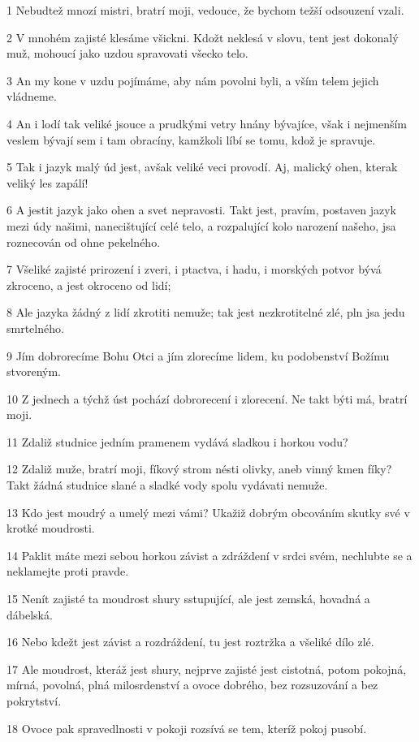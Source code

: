 \par 1 Nebudtež mnozí mistri, bratrí moji, vedouce, že bychom težší odsouzení vzali.
\par 2 V mnohém zajisté klesáme všickni. Kdožt neklesá v slovu, tent jest dokonalý muž, mohoucí jako uzdou spravovati všecko telo.
\par 3 An my kone v uzdu pojímáme, aby nám povolni byli, a vším telem jejich vládneme.
\par 4 An i lodí tak veliké jsouce a prudkými vetry hnány bývajíce, však i nejmenším veslem bývají sem i tam obracíny, kamžkoli líbí se tomu, kdož je spravuje.
\par 5 Tak i jazyk malý úd jest, avšak veliké veci provodí. Aj, malický ohen, kterak veliký les zapálí!
\par 6 A jestit jazyk jako ohen a svet nepravosti. Takt jest, pravím, postaven jazyk mezi údy našimi, nanecištující celé telo, a rozpalující kolo narození našeho, jsa roznecován od ohne pekelného.
\par 7 Všeliké zajisté prirození i zveri, i ptactva, i hadu, i morských potvor bývá zkroceno, a jest okroceno od lidí;
\par 8 Ale jazyka žádný z lidí zkrotiti nemuže; tak jest nezkrotitelné zlé, pln jsa jedu smrtelného.
\par 9 Jím dobrorecíme Bohu Otci a jím zlorecíme lidem, ku podobenství Božímu stvoreným.
\par 10 Z jednech a týchž úst pochází dobrorecení i zlorecení. Ne takt býti má, bratrí moji.
\par 11 Zdaliž studnice jedním pramenem vydává sladkou i horkou vodu?
\par 12 Zdaliž muže, bratrí moji, fíkový strom nésti olivky, aneb vinný kmen fíky? Takt žádná studnice slané a sladké vody spolu vydávati nemuže.
\par 13 Kdo jest moudrý a umelý mezi vámi? Ukažiž dobrým obcováním skutky své v krotké moudrosti.
\par 14 Paklit máte mezi sebou horkou závist a zdráždení v srdci svém, nechlubte se a neklamejte proti pravde.
\par 15 Nenít zajisté ta moudrost shury sstupující, ale jest zemská, hovadná a dábelská.
\par 16 Nebo kdežt jest závist a rozdráždení, tu jest roztržka a všeliké dílo zlé.
\par 17 Ale moudrost, kteráž jest shury, nejprve zajisté jest cistotná, potom pokojná, mírná, povolná, plná milosrdenství a ovoce dobrého, bez rozsuzování a bez pokrytství.
\par 18 Ovoce pak spravedlnosti v pokoji rozsívá se tem, kteríž pokoj pusobí.

